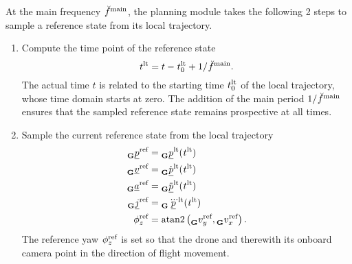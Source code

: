 At the main frequency $\freq[\user]{\main}{}{}{}$, 
the planning module takes the following 2 steps to sample 
a reference state from its local trajectory.
\begin{enumerate}
    \item Compute the time point of the reference state
    \begin{equation}
        \timepnt[]{\loctraj}{}{}{} 
        = 
        t - \timepnt[]{\loctraj}{0}{}{} + 1/\freq[\user]{\main}{}{}{}.
    \end{equation}
    The actual time $t$ is related to the starting time 
    $\timepnt[]{\loctraj}{0}{}{}$
    of the local trajectory,
    whose time domain starts at zero.
    The addition of the main period
    $1/\freq[\user]{\main}{}{}{}$
    ensures that the sampled reference state remains prospective at all times.
    \item Sample the current reference state from the local trajectory
    \begin{align} \label{eq:ref_state}
        \pos[]{\text{ref}}{}{\grs}{} 
        &= 
        \pos[]{\loctraj}{}{\grs}{}(\timepnt[]{\loctraj}{}{}{})
        \nonumber \\
        \vel[]{\text{ref}}{}{\grs}{} 
        &= 
        \pos[\dot]{\loctraj}{}{\grs}{}(\timepnt[]{\loctraj}{}{}{})
        \nonumber \\
        \acc[]{\text{ref}}{}{\grs}{} 
        &= 
        \pos[\ddot]{\loctraj}{}{\grs}{}(\timepnt[]{\loctraj}{}{}{})
        \nonumber \\
        \jerk[]{\text{ref}}{}{\grs}{} 
        &= 
        \pos[\dddot]{\loctraj}{}{\grs}{}(\timepnt[]{\loctraj}{}{}{})
        \nonumber \\
        \ang[]{\text{ref}}{z}{}{}
        &=
        \mathrm{atan2}\left(
            \speed[]{\text{ref}}{y}{\grs}{}
            ,
            \speed[]{\text{ref}}{x}{\grs}{}
        \right).
    \end{align}
    The reference yaw $\ang[]{\text{ref}}{z}{}{}$ is set so that
    the drone and therewith its onboard camera 
    point in the direction of flight movement.
\end{enumerate}











